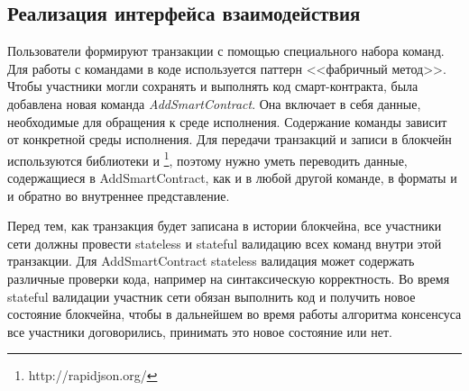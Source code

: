 \subsection{Реализация интерфейса взаимодействия}
\label{AddSmartContract}
Пользователи формируют транзакции с помощью специального набора команд.
Для работы с командами в коде используется паттерн <<фабричный метод>>.
Чтобы участники могли сохранять и выполнять код смарт-контракта, была добавлена новая команда \emph{Add\-Smart\-Con\-tract}.
Она включает в себя данные, необходимые для обращения к среде исполнения.
Содержание команды зависит от конкретной среды исполнения.
Для передачи транзакций и записи в блокчейн используются библиотеки  и \footnote{http://rapidjson.org/}, поэтому нужно уметь переводить данные, содержащиеся в AddSmartContract, как и в любой другой команде, в форматы  и  и обратно во внутреннее представление.

Перед тем, как транзакция будет записана в истории блокчейна, все участники сети должны провести stateless и stateful валидацию всех команд внутри этой транзакции.
Для AddSmartContract stateless валидация может содержать различные проверки кода, например на синтаксическую корректность.
Во время stateful валидации участник сети обязан выполнить код и получить новое состояние блокчейна, чтобы в дальнейшем во время работы алгоритма консенсуса все участники договорились, принимать это новое состояние или нет.

\vspace{0.7cm}


